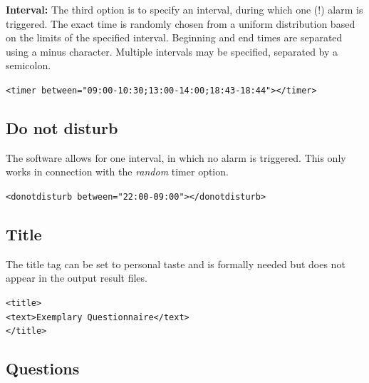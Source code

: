 \documentclass[11pt,a4paper,titlepage]{article}
\begin{document}
\textbf{Interval:} The third option is to specify an interval, during which one (!) alarm is triggered. The exact time is randomly chosen from a uniform distribution based on the limits of the specified interval. Beginning and end times are separated using a minus character. Multiple intervals may be specified, separated by a semicolon.

\begin{center}
\begin{tcolorbox}[colback=black!10!white,colframe=black!50!white, boxsep=1pt,left=4pt,right=4pt,top=4pt,bottom=2pt]
\texttt{<timer between="09:00-10:30;13:00-14:00;18:43-18:44"></timer>}
\end{tcolorbox}
\end{center}


\subsection{Do not disturb}

The software allows for one interval, in which no alarm is triggered. This only works in connection with the \textit{random} timer option. 

\begin{center}
\begin{tcolorbox}[colback=black!10!white,colframe=black!50!white, boxsep=1pt,left=4pt,right=4pt,top=4pt,bottom=2pt]
\texttt{<donotdisturb between="22:00-09:00"></donotdisturb>}
\end{tcolorbox}
\end{center}


\subsection{Title}

The title tag can be set to personal taste and is formally needed but does not appear in the output result files.

\begin{center}
\begin{tcolorbox}[colback=black!10!white,colframe=black!50!white, boxsep=1pt,left=4pt,right=4pt,top=4pt,bottom=2pt]
\texttt{<title>\\
\hspace*{0.5cm}<text>Exemplary Questionnaire</text>\\
</title>}
\end{tcolorbox}
\end{center}


\subsection{Questions}
\end{document}
